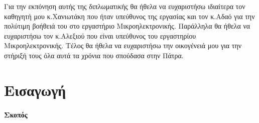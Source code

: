 \documentclass[a4paper,10pt]{article}
\numberwithin{figure}{section}
\numberwithin{table}{section}
\begin{document}

\newpage
\newpage\mbox{}\newpage

Για την  εκπόνηση αυτής της διπλωματικής θα ήθελα να ευχαριστήσω ιδιαίτερα τον καθηγητή μου κ.Χανιωτάκη που ήταν υπεύθυνος της εργασίας και τον κ.Αδαό για την πολύτιμη βοήθειά του στο εργαστήριο Μικροηλεκτρονικής. Παράλληλα θα ήθελα να ευχαριστήσω τον κ.Αλεξιού που είναι υπεύθυνος του εργαστηρίου Μικροηλεκτρονικής. Τέλος θα ήθελα να ευχαριστήσω την οικογένειά μου για την στήριξή τους όλα αυτά τα χρόνια που σπούδασα στην Πάτρα.



\newpage\mbox{}\newpage
\tableofcontents
\newpage
\listoffigures
\newpage
\listoftables
\newpage
\newpage
\section{Εισαγωγή}



\paragraph{\newline\newline Σκοπός\newline\newline}
\end{document}
